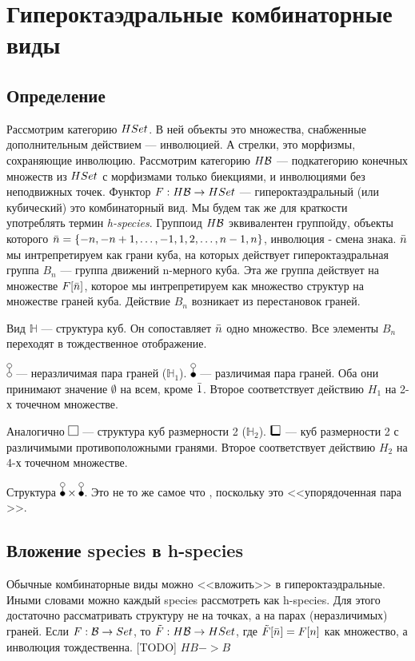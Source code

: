 \section{Гипероктаэдральные комбинаторные виды}
\subsection{Определение}
Рассмотрим категорию $HSet$. В ней объекты это множества, снабженные
дополнительным действием --- инволюцией. А стрелки, это морфизмы, сохраняющие инволюцию. 
Рассмотрим категорию $H\mathcal B$ --- подкатегорию конечных множеств из
$HSet$ с морфизмами только биекциями, и инволюциями без неподвижных точек.
Функтор $F:H\mathcal B \rightarrow HSet$ --- гипероктаэдральный (или кубический)
это комбинаторный вид. Мы будем так же для краткости употреблять термин
\emph{h-species}. Группоид $H\mathcal B$ эквивалентен группойду, объекты которого $\Bar
n = \{-n, -n+1, \dots, -1, 1, 2, \dots, n-1, n\}$, инволюция - смена знака.
$\Bar n$ мы интрепретируем как грани куба, на которых действует
гипероктаэдральная группа $B_n$ --- группа движений n-мерного куба.
Эта же группа действует на множестве $F[\Bar n]$, которое мы
интрепретируем как множество структур на множестве граней куба. Действие
$B_n$ возникает из перестановок граней.

\begin{example}
Вид $\mathbb H$ --- структура куб. Он сопоставляет $\Bar n$ одно множество. Все
элементы $B_n$ переходят в тождественное отображение.
\end{example}
\begin{example}
$\dA$ --- неразличимая пара граней ($\mathbb H_1$). $\dB$ --- различимая пара
граней.
Оба они принимают значение $\emptyset$ на всем, кроме $\Bar 1$. Второе
соответствует действию $H_1$ на 2-х точечном множестве.
\end{example}
\begin{example}
Аналогично $\dAA$ --- структура куб размерности 2 ($\mathbb H_2$). $\dBB$ ---
куб размерности 2 с различимыми противоположными гранями.  Второе
соответствует действию $H_2$ на 4-х точечном множестве.
\end{example}
\begin{example}
Структура $\dB \times \dB$. Это не то же самое что \dBB, поскольку это <<упорядоченная пара \dB>>.
\end{example}

\subsection{Вложение species в h-species}
Обычные комбинаторные виды можно <<вложить>> в гипероктаэдральные. Иными
словами можно каждый species рассмотреть как h-species. Для этого достаточно
рассматривать структуру не на точках, а на парах (неразличимых) граней. Если
$F:\mathcal B \rightarrow Set$, то $\tilde{F}: H\mathcal B \rightarrow HSet$, где
$\tilde{F}[\Bar n] = F[n]$ как множество, а инволюция тождественна.
[TODO] $HB -> B$ 

